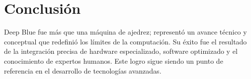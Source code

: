 \documentclass[12pt,a4paper]{article}
\begin{document}
\section{Conclusión}
Deep Blue fue más que una máquina de ajedrez; representó un avance técnico y conceptual que redefinió los límites de la computación. Su éxito fue el resultado de la integración precisa de hardware especializado, software optimizado y el conocimiento de expertos humanos. Este logro sigue siendo un punto de referencia en el desarrollo de tecnologías avanzadas.

\end{document}
